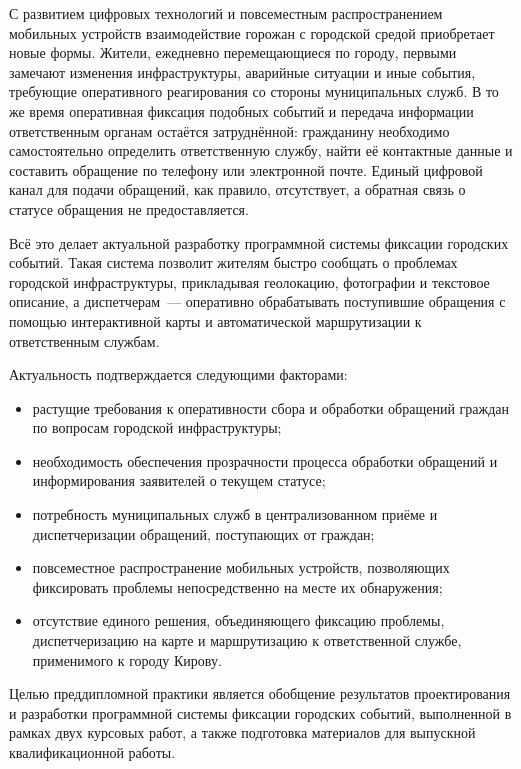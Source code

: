 С развитием цифровых технологий и повсеместным распространением мобильных устройств
взаимодействие горожан с городской средой приобретает новые формы.
Жители, ежедневно перемещающиеся по городу, первыми замечают изменения инфраструктуры,
аварийные ситуации и иные события, требующие оперативного реагирования со стороны
муниципальных служб. В то же время оперативная фиксация подобных событий и передача
информации ответственным органам остаётся затруднённой: гражданину необходимо
самостоятельно определить ответственную службу, найти её контактные данные и составить
обращение по телефону или электронной почте. Единый цифровой канал для подачи обращений,
как правило, отсутствует, а обратная связь о статусе обращения не предоставляется.

Всё это делает актуальной разработку программной системы фиксации
городских событий. Такая система позволит жителям быстро сообщать о проблемах
городской инфраструктуры, прикладывая геолокацию, фотографии и
текстовое описание, а диспетчерам~--- оперативно обрабатывать поступившие обращения
с помощью интерактивной карты и автоматической маршрутизации к ответственным службам.

Актуальность подтверждается следующими факторами:
\begin{itemize}
    \item растущие требования к оперативности сбора и обработки обращений граждан
          по вопросам городской инфраструктуры;
    \item необходимость обеспечения прозрачности процесса обработки обращений и
          информирования заявителей о текущем статусе;
    \item потребность муниципальных служб в централизованном приёме и диспетчеризации
          обращений, поступающих от граждан;
    \item повсеместное распространение мобильных устройств, позволяющих фиксировать
          проблемы непосредственно на месте их обнаружения;
    \item отсутствие единого решения, объединяющего фиксацию проблемы, диспетчеризацию
          на карте и маршрутизацию к ответственной службе, применимого к городу Кирову.
\end{itemize}

Целью преддипломной практики является обобщение результатов проектирования и разработки
программной системы фиксации городских событий, выполненной в рамках двух курсовых работ,
а также подготовка материалов для выпускной квалификационной работы.

